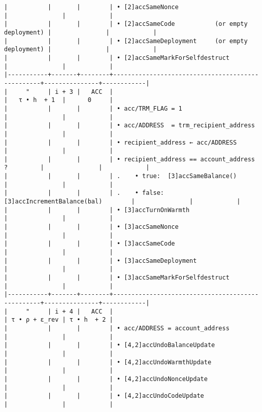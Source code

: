 \documentclass[varwidth=\maxdimen,margin=0.5cm,multi={verbatim}]{standalone}
\begin{document}
\begin{verbatim}
|           |       |        | • [2]accSameNonce                                |               |            |
|           |       |        | • [2]accSameCode           (or empty deployment) |               |            |
|           |       |        | • [2]accSameDeployment     (or empty deployment) |               |            |
|           |       |        | • [2]accSameMarkForSelfdestruct                  |               |            |
|-----------+-------+--------+--------------------------------------------------+---------------+------------|
|     "     | i + 3 |   ACC  |                                                  |   τ • h  + 1  |      0     |
|           |       |        | • acc/TRM_FLAG = 1                               |               |            |
|           |       |        | • acc/ADDRESS  = trm_recipient_address           |               |            |
|           |       |        | • recipient_address ← acc/ADDRESS                |               |            |
|           |       |        | • recipient_address == account_address ?         |               |            |
|           |       |        | .    • true:  [3]accSameBalance()                |               |            |
|           |       |        | .    • false: [3]accIncrementBalance(bal)        |               |            |
|           |       |        | • [3]accTurnOnWarmth                             |               |            |
|           |       |        | • [3]accSameNonce                                |               |            |
|           |       |        | • [3]accSameCode                                 |               |            |
|           |       |        | • [3]accSameDeployment                           |               |            |
|           |       |        | • [3]accSameMarkForSelfdestruct                  |               |            |
|-----------+-------+--------+--------------------------------------------------+---------------+------------|
|     "     | i + 4 |   ACC  |                                                  | τ • ρ + ε_rev | τ • h  + 2 |
|           |       |        | • acc/ADDRESS = account_address                  |               |            |
|           |       |        | • [4,2]accUndoBalanceUpdate                      |               |            |
|           |       |        | • [4,2]accUndoWarmthUpdate                       |               |            |
|           |       |        | • [4,2]accUndoNonceUpdate                        |               |            |
|           |       |        | • [4,2]accUndoCodeUpdate                         |               |            |

\end{verbatim}
\end{document}
